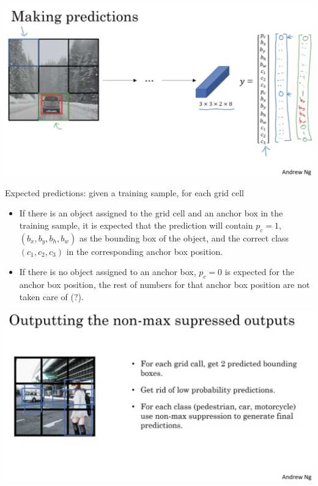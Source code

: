 \documentclass{article}
\begin{document}
\begin{center}
\includegraphics[scale=0.3]{./images/yolo_prediction.png}
\end{center}

\noindent Expected predictions: given a training sample, for each grid cell

\begin{itemize}
    \item If there is an object assigned to the grid cell and an anchor box in the training sample, it is expected that the prediction will contain \(p_{c} = 1\), \((b_{x}, b_{y}, b_{h}, b_{w})\) as the bounding box of the object, and the correct class \((c_{1}, c_{2}, c_{3})\) in the corresponding anchor box position.
    \item If there is no object assigned to an anchor box, \(p_{c} = 0\) is expected for the anchor box position, the rest of numbers for that anchor box position are not taken care of (?).
\end{itemize}

\begin{center}
\includegraphics[scale=0.3]{./images/yolo_output.png}
\end{center}
\end{document}
